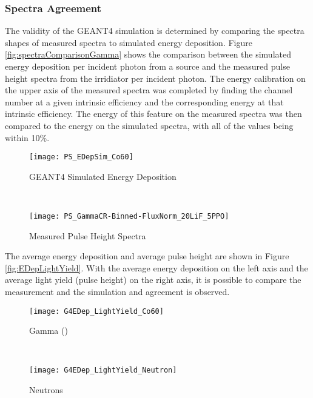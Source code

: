 \subsubsection{Spectra Agreement}
The validity of the GEANT4 simulation is determined by comparing the spectra shapes of measured spectra to simulated energy deposition.
Figure \ref{fig:spectraComparisonGamma} shows the comparison between the simulated energy deposition per incident photon from a  source and the measured pulse height spectra from the  irridiator per incident photon.
The energy calibration on the upper axis of the measured spectra was completed by finding the channel number at a given intrinsic efficiency and the corresponding energy at that intrinsic efficiency.
The energy of this feature on the measured spectra was then compared to the energy on the simulated spectra, with all of the values being within 10\%.
\begin{figure*}[ht]
	\centering
	\begin{subfigure}[b]{0.45\textwidth}
    		\texttt{[image: PS\_EDepSim\_Co60]}
		\caption{GEANT4 Simulated Energy Deposition}
	\end{subfigure}%
	~
	\begin{subfigure}[b]{0.45\textwidth}
    \texttt{[image: PS\_GammaCR-Binned-FluxNorm\_20LiF\_5PPO]}
		\caption{Measured Pulse Height Spectra}
	\end{subfigure}%
	\caption{Comparison of the energy deposition and binned pulse height spectra for validation. The spectra have the same shape, indicating agreement. The fabricated films greater than \SI{600}{\um} were of poor optical quality and therefore their results are not shown.}
	\label{fig:spectraComparisonGamma}
\end{figure*}
The average energy deposition and average pulse height are shown in Figure \ref{fig:EDepLightYield}. 
With the average energy deposition on the left axis and the average light yield (pulse height) on the right axis, it is possible to compare the measurement and the simulation and agreement is observed.
\begin{figure*}[ht]
	\centering
	\begin{subfigure}[b]{0.45\textwidth}
    		\texttt{[image: G4EDep\_LightYield\_Co60]}
		\caption{Gamma ()}
	\end{subfigure}%
	~
	\begin{subfigure}[b]{0.45\textwidth}
    		\texttt{[image: G4EDep\_LightYield\_Neutron]}
		\caption{Neutrons}
	\end{subfigure}%
	\caption{Average Energy Deposition and Measured Light Yield. The solid lines are calculated values and the red dots are measurements.}
	\label{fig:EDepLightYield}
\end{figure*}
